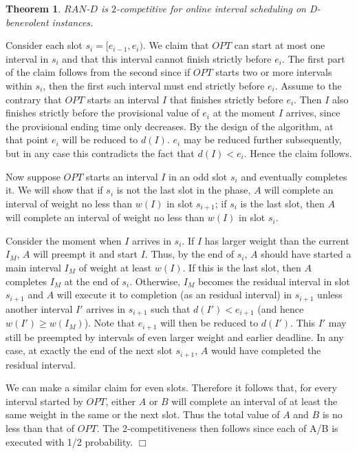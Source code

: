 \documentclass[11pt]{article}
\newtheorem{theorem}{Theorem}[section]
\newcommand{\qed}{\hspace*{\fill}$\Box$\par\medskip}
\newenvironment{proof}{\noindent{\it Proof. }\ignorespaces}{\qed}
\begin{document}
\begin{theorem}
$RAN$-$D$ is $2$-competitive for online interval scheduling on
D-benevolent instances.
\end{theorem}
\begin{proof}
Consider each slot $s_i = [e_{i-1}, e_i)$.
We claim that $OPT$ can start at most one interval in $s_i$
and that this interval cannot finish strictly before $e_i$.
The first part of the claim follows from the second since
if $OPT$ starts two or more intervals within $s_i$, then the first 
such interval must end strictly before $e_i$. 
Assume to the contrary that $OPT$ starts an interval $I$ that finishes
strictly before $e_i$. 
Then $I$ also finishes strictly before the provisional value of $e_i$ 
at the moment $I$ arrives, since the provisional ending time only decreases.
By the design of the algorithm, at that point
$e_i$ will be reduced to $d(I)$. 
$e_i$ may be reduced further subsequently, but in any case this contradicts
the fact that $d(I)<e_i$.
Hence the claim follows.

Now suppose $OPT$ starts an interval $I$ in an odd slot $s_i$ and eventually
completes it.
We will show that if $s_i$ is not the last slot in the phase, 
$A$ will complete an interval of weight no less than $w(I)$ in slot $s_{i+1}$;
if $s_i$ is the last slot, then $A$ will complete an interval of weight
no less than $w(I)$ in slot $s_i$.

Consider the moment when $I$ arrives in $s_i$.
If $I$ has larger weight than the current $I_M$,
$A$ will preempt it and start $I$.
Thus, by the end of $s_i$,
$A$ should have started a main interval $I_M$ of weight at least $w(I)$.
If this is the last slot, then $A$ completes $I_M$ at the end of $s_i$.
Otherwise, $I_M$ becomes the residual interval in slot $s_{i+1}$
and $A$ will execute it to completion (as an residual interval) in $s_{i+1}$
unless another interval $I'$ arrives in $s_{i+1}$ such that 
$d(I') < e_{i+1}$ (and hence $w(I') \ge w(I_M)$).
Note that $e_{i+1}$ will then be reduced to $d(I')$.
This $I'$ may still be preempted by intervals of even larger weight
and earlier deadline.
In any case, at exactly the end of the next slot $s_{i+1}$,
$A$ would have completed the residual interval.

We can make a similar claim for even slots.
Therefore it follows that, for every interval started by $OPT$, 
either $A$ or $B$ will complete an interval of at least the same weight 
in the same or the next slot.
Thus the total value of $A$ and $B$ is no less than that of $OPT$.
The 2-competitiveness then follows since each of A/B is executed with
1/2 probability.  
\end{proof}
\end{document}
